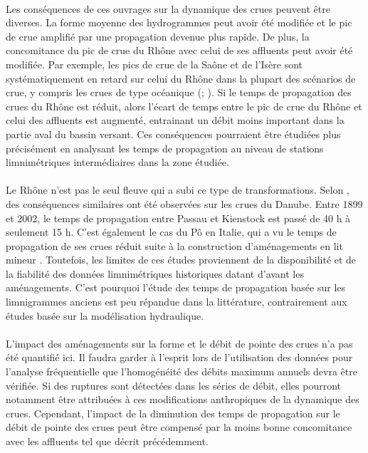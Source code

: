 \documentclass[11pt]{article}
\begin{document}
	\paragraph{} Les conséquences de ces ouvrages sur la dynamique des crues peuvent être
diverses. La forme moyenne des hydrogrammes peut avoir été modifiée et le pic de crue amplifié par une propagation devenue plus rapide. De plus, la concomitance du pic de crue du Rhône avec celui de ses affluents peut avoir été modifiée. Par exemple, les pics de crue de la Saône et de l'Isère sont systématiquement en retard sur celui du Rhône dans la plupart des scénarios de crue, y compris les crues de type océanique (\cite{parde_regime_1925}; \cite{rigaudiere_etude_2000}). Si le temps de propagation des crues du Rhône est réduit, alors l'écart de temps entre le pic de crue du Rhône et celui des affluents est augmenté, entrainant un débit moins important dans la partie aval du bassin versant. Ces conséquences pourraient être étudiées plus précisément en analysant les temps de propagation au niveau de stations limnimétriques intermédiaires dans la zone étudiée.

	\paragraph{} Le Rhône n'est pas le seul fleuve qui a subi ce type de transformations. Selon \citet{mitkova_analysis_2005}, des conséquences similaires ont été observées sur les crues du Danube. Entre 1899 et 2002, le temps de propagation entre Passau et Kienstock est passé de 40 h à seulement 15 h. C'est également le cas du Pô en Italie, qui a vu le temps de propagation de ses crues réduit suite à la construction d'aménagements en lit mineur \citep{di_baldassare_analysis_2009}. Toutefois, les limites de ces études proviennent de la disponibilité et de la fiabilité des données limnimétriques historiques datant d'avant les aménagements. C'est pourquoi l'étude des temps de propagation basée sur les limnigrammes anciens est peu répandue dans la littérature, contrairement aux études basée sur la modélisation hydraulique.
	
	\paragraph{} L'impact des aménagements sur la forme et le débit de pointe des crues n'a pas été quantifié ici. Il faudra garder à l'esprit lors de l'utilisation des données pour l'analyse fréquentielle que l'homogénéité des débits maximum annuels devra être vérifiée. Si des ruptures sont détectées dans les séries de débit, elles pourront notamment être attribuées à ces modifications anthropiques de la dynamique des crues. Cependant, l'impact de la diminution des temps de propagation sur le débit de pointe des crues peut être compensé par la moins bonne concomitance avec les affluents tel que décrit précédemment.
\end{document}
